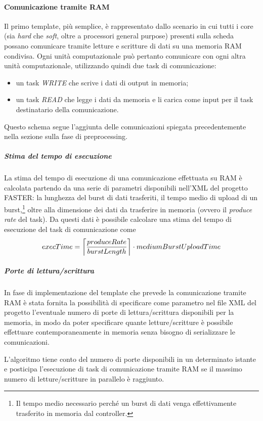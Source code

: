 \paragraph{Comunicazione tramite \acs{RAM}}
Il primo template, più semplice, è rappresentato dallo scenario in cui tutti i 
core (sia \emph{hard} che \emph{soft}, oltre a processori general purpose) presenti sulla 
scheda possano comunicare tramite letture e scritture di dati su una memoria 
\acs{RAM} condivisa. Ogni unità computazionale può pertanto comunicare con ogni 
altra unità computazionale, utilizzando quindi due task di comunicazione:
\begin{itemize}
 \item un task \emph{WRITE} che scrive i dati di output in memoria;
 \item un task \emph{READ} che legge i dati da memoria e li carica come input 
per il task destinatario della comunicazione.
\end{itemize}
Questo schema segue l'aggiunta delle comunicazioni spiegata precedentemente 
nella sezione sulla fase di preprocessing.

\subparagraph{Stima del tempo di esecuzione}
La stima del tempo di esecuzione di una comunicazione effettuata su \acs{RAM} è 
calcolata partendo da una serie di parametri disponibili nell'XML del progetto 
\ac{FASTER}: la lunghezza del burst di dati trasferiti, il tempo medio di upload 
di un burst,\footnote{Il tempo medio necessario perch\'e un burst di dati venga 
effettivamente trasferito in memoria dal controller.} oltre alla dimensione 
dei dati da trasferire in memoria (ovvero il \emph{produce rate} del task). Da 
questi dati è possibile calcolare una stima del tempo di esecuzione del task di 
comunicazione come
\begin{equation}
execTime = \ceil[\bigg]{\frac{produceRate}{burstLength}} \cdot 
mediumBurstUploadTime
\end{equation}

\subparagraph{Porte di lettura/scrittura}
In fase di implementazione del template che prevede la comunicazione tramite 
\acs{RAM} è stata fornita la possibilità di specificare come parametro nel file 
XML del progetto l'eventuale numero di porte di lettura/scrittura disponibili 
per la memoria, in modo da poter specificare quante letture/scritture è 
possibile effettuare contemporaneamente in memoria senza bisogno di 
serializzare le comunicazioni.

L'algoritmo tiene conto del numero di porte disponibili in un determinato istante
e posticipa l'esecuzione di task di comunicazione tramite \acs{RAM} se il
massimo numero di letture/scritture in parallelo è raggiunto.


